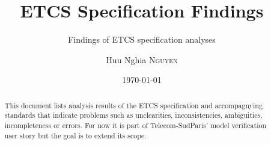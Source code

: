 \documentclass{template/openetcs_article}
\begin{document}
\frontmatter
{}






\title{ETCS Specification Findings}

\subtitle{Findings of ETCS specification analyses}

\date{\today}


\author{Huu Nghia \textsc{Nguyen}}







\begin{abstract}
  This document lists analysis results of the ETCS specification and accompagnying standards that indicate problems such as unclearities, inconsistencies, ambiguities, incompleteness or errors. For now it is part of Telecom-SudParis' model verification user story but the goal is to extend its scope.
\end{abstract}

\newcommand{\issue}[1]{\refstepcounter{issuecounter}\textbf{Issue \#\arabic{issuecounter} (#1):}}	

\newcommand{\resolution}{\textit{Resolution: }}	

\maketitle
\end{document}
